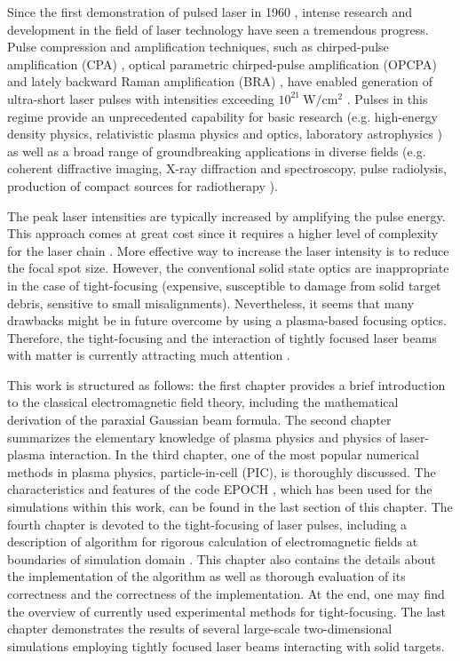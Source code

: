 Since the first demonstration of pulsed laser in 1960 \cite{Maiman1960}, intense research and development in the field of laser technology have seen a tremendous progress. Pulse compression and amplification techniques, such as chirped-pulse amplification (CPA) \cite{StricklandMourou1985}, optical parametric chirped-pulse amplification (OPCPA) \cite{Dubietis1992} and lately backward Raman amplification (BRA) \cite{Malkin1999}, have enabled generation of ultra-short laser pulses with intensities exceeding $ 10^{21} \ \mathrm{W/cm^{2}} $ \cite{Danson2015}. Pulses in this regime provide an unprecedented capability for basic research (e.g. high-energy density physics, relativistic plasma physics and optics, laboratory astrophysics \cite{Council2003, Graziani2014, Lebedev2007, Bridgman1958, Krehl2008, Andreev2006, Weber2013, Bulanov2015, Zakharov2003}) as well as a broad range of groundbreaking applications in diverse fields (e.g. coherent diffractive imaging, X-ray diffraction and spectroscopy, pulse radiolysis, production of compact sources for radiotherapy \cite{Zewail2010, Bulanov2004, Malka2004}).

The peak laser intensities are typically increased by amplifying the pulse energy. This approach comes at great cost since it requires a higher level of complexity for the laser chain \cite{Fuchs2014}. More effective way to increase the laser intensity is to reduce the focal spot size. However, the conventional solid state optics are inappropriate in the case of tight-focusing (expensive, susceptible to damage from solid target debris, sensitive to small misalignments). Nevertheless, it seems that many drawbacks might be in future overcome by using a plasma-based focusing optics. Therefore, the tight-focusing and the interaction of tightly focused laser beams with matter is currently attracting much attention \cite{Popov2008, Popov2009, Lifschitz2016, Yan2005}. 

This work is structured as follows: the first chapter provides a brief introduction to the classical electromagnetic field theory, including the mathematical derivation of the paraxial Gaussian beam formula. The second chapter summarizes the elementary knowledge of plasma physics and physics of laser-plasma interaction. In the third chapter, one of the most popular numerical methods in plasma physics, particle-in-cell (PIC), is thoroughly discussed. The characteristics and features of the code EPOCH \cite{bennett}, which has been used for the simulations within this work, can be found in the last section of this chapter. The fourth chapter is devoted to the tight-focusing of laser pulses, including a description of algorithm for rigorous calculation of electromagnetic fields at boundaries of simulation domain \cite{Thiele2016}. This chapter also contains the details about the implementation of the algorithm as well as thorough evaluation of its correctness and the correctness of the implementation. At the end, one may find the overview of currently used experimental methods for tight-focusing. The last chapter demonstrates the results of several large-scale two-dimensional simulations employing tightly focused laser beams interacting with solid targets.


